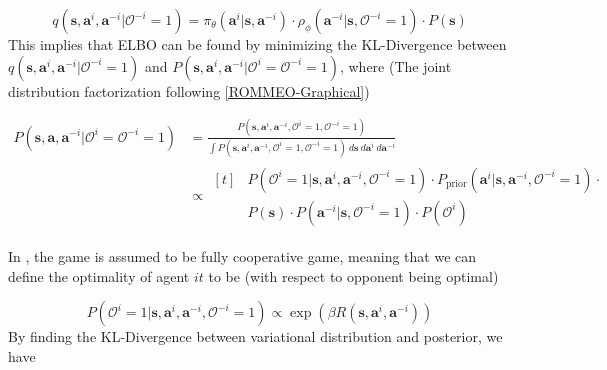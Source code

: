 \begin{equation}
    q(\boldsymbol{s}, \boldsymbol{a}^i, \boldsymbol{a}^{-i} | \mathcal{O}^{-i} = 1) = \pi_{\theta}(\boldsymbol{a}^i | \boldsymbol{s}, \boldsymbol{a}^{-i}) \cdot \rho_{\phi}(\boldsymbol{a}^{-i} | \boldsymbol{s}, \mathcal{O}^{-i} = 1) \cdot P(\boldsymbol{s})
\end{equation}
This implies that ELBO can be found by minimizing the KL-Divergence between $q(\boldsymbol{s}, \boldsymbol{a}^i, \boldsymbol{a}^{-i} | \mathcal{O}^{-i} = 1)$ and $P(\boldsymbol{s}, \boldsymbol{a}^i, \boldsymbol{a}^{-i} | \mathcal{O}^{i} = \mathcal{O}^{-i} = 1)$, where (The joint distribution factorization following \ref{ROMMEO-Graphical})

\begin{equation}
    \begin{aligned}
        P(\boldsymbol{s}, \boldsymbol{a}, \boldsymbol{a}^{-i} | \mathcal{O}^{i} = \mathcal{O}^{-i} = 1) &= \frac{P(\boldsymbol{s}, \boldsymbol{a}^i, \boldsymbol{a}^{-i}, \mathcal{O}^{i} = 1,  \mathcal{O}^{-i} = 1)}{\int P(\boldsymbol{s}, \boldsymbol{a}^i, \boldsymbol{a}^{-i}, \mathcal{O}^{i} = 1,  \mathcal{O}^{-i} = 1) \ d\boldsymbol{s} \ d\boldsymbol{a}^i \ d\boldsymbol{a}^{-i}} \\ 
        &\propto \begin{aligned}[t]
            &P(\mathcal{O}^i = 1 | \boldsymbol{s}, \boldsymbol{a}^i, \boldsymbol{a}^{-i}, \mathcal{O}^{-i} = 1) \cdot P_{\text{prior}}(\boldsymbol{a}^i | \boldsymbol{s}, \boldsymbol{a}^{-i}, \mathcal{O}^{-i} = 1) \cdot \\
            &P(\boldsymbol{s}) \cdot P(\boldsymbol{a}^{-i} |\boldsymbol{s}, \mathcal{O}^{-i} = 1) \cdot P(\mathcal{O}^{i})
        \end{aligned}
    \end{aligned}
\end{equation}

In \cite{tian2019regularized}, the game is assumed to be fully cooperative game, meaning that we can define the optimality of agent $it$ to be (with respect to opponent being optimal)

\begin{equation}
    P(\mathcal{O}^i = 1 | \boldsymbol{s}, \boldsymbol{a}^i, \boldsymbol{a}^{-i}, \mathcal{O}^{-i} = 1) \propto \exp \left( \beta R(\boldsymbol{s}, \boldsymbol{a}^i, \boldsymbol{a}^{-i}) \right)
\end{equation}
By finding the KL-Divergence between variational distribution and posterior, we have 

